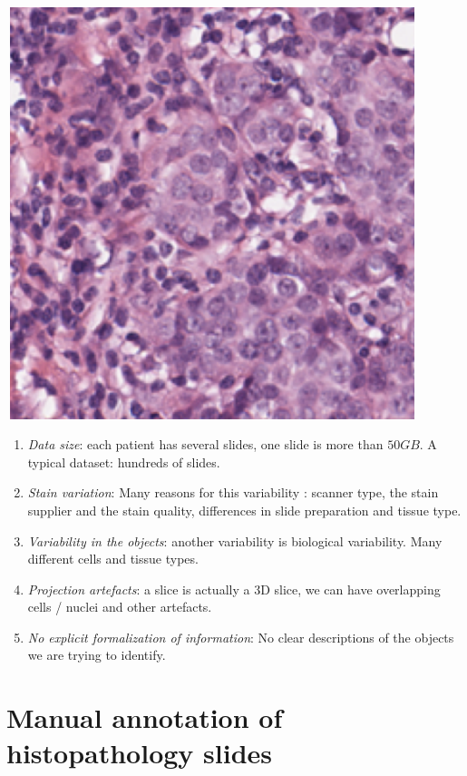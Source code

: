 \documentclass[a0,portrait]{a0poster}
\begin{document}
\begin{multicols}{2}
\begin{center}
   \includegraphics[height=12cm, width = 12cm]{histo3.png}
\end{center}

\begin{enumerate}
\item {\em Data size}: each patient has several slides, one slide is more than $50 GB$. A typical dataset: hundreds of slides. 

\item {\em Stain variation}: Many reasons for this variability : 
 scanner type, the stain supplier and
  the stain quality, differences in slide preparation and tissue
  type. 
\item {\em Variability in the objects}: another variability is biological variability. Many different cells and tissue types.
\item {\em Projection artefacts}: a slice is actually a 3D slice, we can have overlapping cells / nuclei
  and other artefacts.
\item {\em No explicit formalization of information}:
  No clear descriptions of the objects we are trying to identify.  
\end{enumerate}

\section*{Manual annotation of histopathology slides}


\end{multicols}
\end{document}
